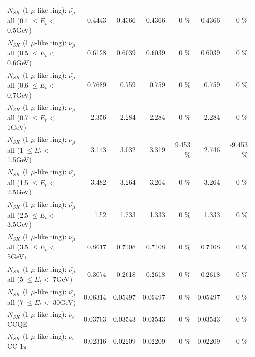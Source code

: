 \begin{table}
\begin{tabular}{| l | r | r | r  r | r  r |}
 $N_{SK}$ (1 $\mu$-like ring): $\bar{\nu_{\mu}}$ all (0.4 $\leq E_{t} <$ 0.5GeV) &          0.4443 &          0.4366 &          0.4366 &        0 \%  &          0.4366 &        0 \%  \\ 
 $N_{SK}$ (1 $\mu$-like ring): $\bar{\nu_{\mu}}$ all (0.5 $\leq E_{t} <$ 0.6GeV) &          0.6128 &          0.6039 &          0.6039 &        0 \%  &          0.6039 &        0 \%  \\ 
 $N_{SK}$ (1 $\mu$-like ring): $\bar{\nu_{\mu}}$ all (0.6 $\leq E_{t} <$ 0.7GeV) &          0.7689 &           0.759 &           0.759 &        0 \%  &           0.759 &        0 \%  \\ 
   $N_{SK}$ (1 $\mu$-like ring): $\bar{\nu_{\mu}}$ all (0.7 $\leq E_{t} <$ 1GeV) &           2.356 &           2.284 &           2.284 &        0 \%  &           2.284 &        0 \%  \\ 
   $N_{SK}$ (1 $\mu$-like ring): $\bar{\nu_{\mu}}$ all (1 $\leq E_{t} <$ 1.5GeV) &           3.143 &           3.032 &           3.319 &    9.453 \%  &           2.746 &   -9.453 \%  \\ 
 $N_{SK}$ (1 $\mu$-like ring): $\bar{\nu_{\mu}}$ all (1.5 $\leq E_{t} <$ 2.5GeV) &           3.482 &           3.264 &           3.264 &        0 \%  &           3.264 &        0 \%  \\ 
 $N_{SK}$ (1 $\mu$-like ring): $\bar{\nu_{\mu}}$ all (2.5 $\leq E_{t} <$ 3.5GeV) &            1.52 &           1.333 &           1.333 &        0 \%  &           1.333 &        0 \%  \\ 
   $N_{SK}$ (1 $\mu$-like ring): $\bar{\nu_{\mu}}$ all (3.5 $\leq E_{t} <$ 5GeV) &          0.8617 &          0.7408 &          0.7408 &        0 \%  &          0.7408 &        0 \%  \\ 
     $N_{SK}$ (1 $\mu$-like ring): $\bar{\nu_{\mu}}$ all (5 $\leq E_{t} <$ 7GeV) &          0.3074 &          0.2618 &          0.2618 &        0 \%  &          0.2618 &        0 \%  \\ 
    $N_{SK}$ (1 $\mu$-like ring): $\bar{\nu_{\mu}}$ all (7 $\leq E_{t} <$ 30GeV) &         0.06314 &         0.05497 &         0.05497 &        0 \%  &         0.05497 &        0 \%  \\ 
\hline
\hline
\hline
                                      $N_{SK}$ (1 $\mu$-like ring): $\nu_e$ CCQE &         0.03703 &         0.03543 &         0.03543 &        0 \%  &         0.03543 &        0 \%  \\ 
                                 $N_{SK}$ (1 $\mu$-like ring): $\nu_e$ CC 1$\pi$ &         0.02316 &         0.02209 &         0.02209 &        0 \%  &         0.02209 &        0 \%  \\ 

\end{tabular}
\end{table}
